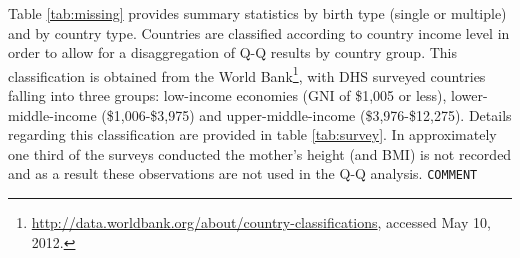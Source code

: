 \documentclass{article}[11pt,subeqn]
\begin{document}
\begin{spacing}{1.5}
Table \ref{tab:missing} provides summary statistics by birth type (single or multiple) and by country type.  Countries are classified 
according to country income level in order to allow for a disaggregation of Q-Q results by country group.  This classification is obtained
from the World Bank\footnote{\url{http://data.worldbank.org/about/country-classifications},  accessed May 10, 2012.}, with DHS
surveyed countries falling into three groups: low-income economies (GNI of \$1,005 or less), lower-middle-income (\$1,006-\$3,975)
and upper-middle-income (\$3,976-\$12,275).  Details regarding this classification are provided in table \ref{tab:survey}.  In approximately 
one third of the surveys conducted the mother's height (and BMI) is not recorded and as a result these observations are not used in the 
Q-Q analysis.  \texttt{COMMENT}



\end{spacing}
\end{document}
